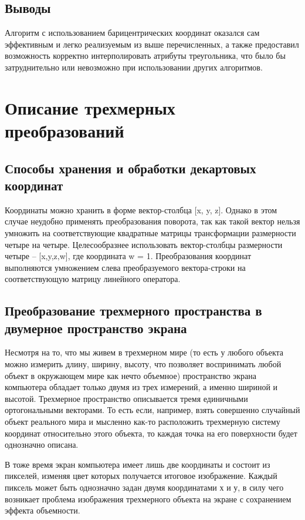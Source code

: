 \documentclass[12pt,a4paper,oneside]{report}
\begin{document}
	\subsection{Выводы}
	 \quad Алгоритм с использованием барицентрических координат оказался сам эффективным и легко реализуемым из выше перечисленных, а также предоставил возможность корректно интерполировать атрибуты треугольника, что было бы затруднительно или невозможно при использовании других алгоритмов.
	
	\section{Описание трехмерных преобразований}
	
	\subsection{Способы хранения и обработки декартовых координат}
	 \quad Координаты можно хранить в форме вектор-столбца [x, y, z]. Однако в этом случае неудобно применять преобразования поворота, так как такой вектор нельзя умножить на соответствующие квадратные матрицы трансформации размерности четыре на четыре. Целесообразнее использовать вектор-столбцы размерности четыре -- [x,y,z,w], где координата w = 1. Преобразования координат выполняются умножением слева преобразуемого вектора-строки на соответствующую матрицу линейного оператора.
	
	\subsection{Преобразование трехмерного пространства в двумерное пространство экрана}
	 \quad Несмотря на то, что мы живем в трехмерном мире (то есть у любого объекта можно измерить длину, ширину, высоту, что позволяет воспринимать любой объект в окружающем мире как нечто объемное) пространство экрана компьютера обладает только двумя из трех измерений, а именно шириной и высотой. Трехмерное пространство описывается тремя единичными ортогональными векторами. То есть если, например, взять совершенно случайный объект реального мира и мысленно как-то расположить трехмерную систему координат относительно этого объекта, то каждая точка на его поверхности будет однозначно описана. 
	
	 В тоже время экран компьютера имеет лишь две координаты и состоит из пикселей, изменяя цвет которых получается итоговое изображение. Каждый пиксель может быть однозначно задан двумя координатами х и у, в силу чего возникает проблема изображения трехмерного объекта на экране с сохранением эффекта объемности.
	
\end{document}
